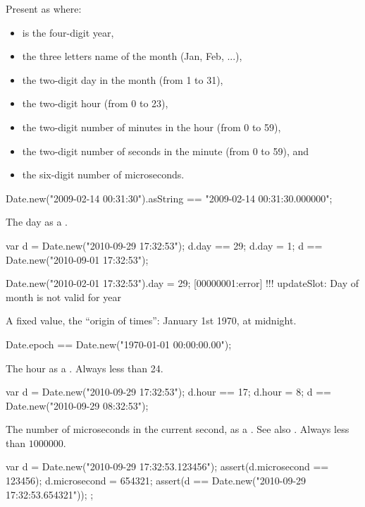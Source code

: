\begin{urbiscriptapi}
\item[asString] Present as  where:
  \begin{itemize}
  \item {} is the four-digit year,
  \item {} the three letters name of the month (Jan, Feb, ...),
  \item {} the two-digit day in the month (from 1 to 31),
  \item {} the two-digit hour (from 0 to 23),
  \item {} the two-digit number of minutes in the hour (from 0 to 59),
  \item {} the two-digit number of seconds in the minute (from 0 to
    59), and
  \item {} the six-digit number of microseconds.
  \end{itemize}
\begin{urbiassert}
Date.new("2009-02-14 00:31:30").asString == "2009-02-14 00:31:30.000000";
\end{urbiassert}


\item[day]
  The day as a .
\begin{urbiassert}
var d = Date.new("2010-09-29 17:32:53");
d.day == 29;
d.day = 1;
d == Date.new("2010-09-01 17:32:53");
\end{urbiassert}
\begin{urbiscript}
Date.new("2010-02-01 17:32:53").day = 29;
[00000001:error] !!! updateSlot: Day of month is not valid for year
\end{urbiscript}


\item[epoch]
  A fixed value, the ``origin of times'': January 1st 1970, at
  midnight.
\begin{urbiunchecked}
Date.epoch == Date.new("1970-01-01 00:00:00.00");
\end{urbiunchecked}


\item[hour]
  The hour as a .  Always less than 24.
\begin{urbiassert}
var d = Date.new("2010-09-29 17:32:53");
d.hour == 17;
d.hour = 8;
d == Date.new("2010-09-29 08:32:53");
\end{urbiassert}

\item[microsecond]%
  The number of microseconds in the current second, as a .
  See also .  Always less than $1000 000$.
\begin{urbiscript}
{
  var d = Date.new("2010-09-29 17:32:53.123456");
  assert(d.microsecond == 123456);
  d.microsecond = 654321;
  assert(d == Date.new("2010-09-29 17:32:53.654321"));
};
\end{urbiscript}


\end{urbiscriptapi}
